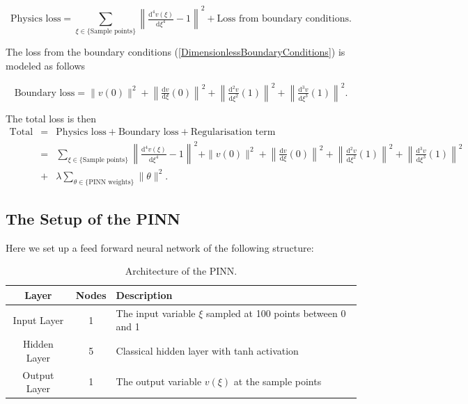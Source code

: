 \documentclass[a4paper,11pt]{article}
\begin{document}
\begin{equation*}
\text{Physics loss} = \sum_{\xi \in \{\text{Sample points}\}} \left\| \tfrac{\mathrm{d}^4 v(\xi)}{\mathrm{d}\xi^4} -1 \right\|^2 + \text{Loss from boundary conditions}.
\end{equation*}

The loss from the boundary conditions (\ref{DimensionlessBoundaryConditions}) is modeled as follows

\begin{equation*}
\text{Boundary loss} = \| v (0) \|^2 + \left\|\tfrac{\mathrm{d} v}{\mathrm{d}\xi}(0) \right\|^2 + \left\|\tfrac{\mathrm{d}^2 v}{\mathrm{d}\xi^2} (1) \right\|^2 + \left\|\tfrac{\mathrm{d}^3 v}{\mathrm{d}\xi^3}(1) \right\|^2 .
\end{equation*}

The total loss is then
\begin{eqnarray} \label{LossDirectProblem}
\text{Total loss} & = & \text{Physics loss} + \text{Boundary loss} + \text{Regularisation term} \\
 & = & \sum_{\xi \in \{\text{Sample points}\}} \left\| \tfrac{\mathrm{d}^4 v(\xi)}{\mathrm{d}\xi^4} -1 \right\|^2 + \| v (0) \|^2 + \left\|\tfrac{\mathrm{d} v}{\mathrm{d}\xi}(0) \right\|^2 + \left\|\tfrac{\mathrm{d}^2 v}{\mathrm{d}\xi^2} (1) \right\|^2 + \left\|\tfrac{\mathrm{d}^3 v}{\mathrm{d}\xi^3}(1) \right\|^2 \\ 
 & + & \lambda \sum_{\theta \in \{\text{PINN weights}\}} \| \theta \|^2 .
\end{eqnarray}

\subsection*{The Setup of the PINN}
Here we set up a feed forward neural network of the following structure:
\begin{table}[h!]
\centering
\begin{tabular}{ccl}
\toprule
\textbf{Layer} & \textbf{Nodes} & \textbf{Description}\\
\midrule
Input Layer & 1 & The input variable $\xi $ sampled at 100 points between 0 and 1\\
Hidden Layer & 5 & Classical hidden layer with tanh activation\\
Output Layer & 1 & The output variable $v(\xi ) $ at the sample points\\
\bottomrule
\end{tabular}
\caption{Architecture of the PINN.}
\end{table}
\end{document}
